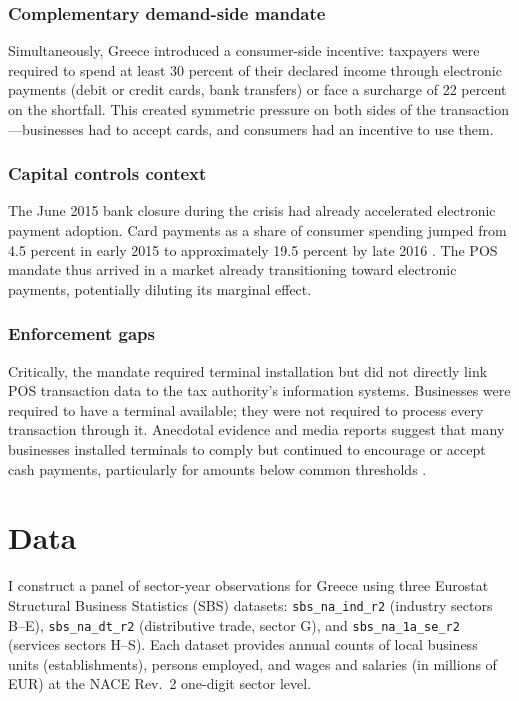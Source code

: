 \documentclass[12pt]{article}
\begin{document}
\subsubsection*{Complementary demand-side mandate} Simultaneously, Greece introduced a consumer-side incentive: taxpayers were required to spend at least 30 percent of their declared income through electronic payments (debit or credit cards, bank transfers) or face a surcharge of 22 percent on the shortfall. This created symmetric pressure on both sides of the transaction---businesses had to accept cards, and consumers had an incentive to use them.

\subsubsection*{Capital controls context} The June 2015 bank closure during the crisis had already accelerated electronic payment adoption. Card payments as a share of consumer spending jumped from 4.5 percent in early 2015 to approximately 19.5 percent by late 2016 \citep{hondroyiannis2020fiscal}. The POS mandate thus arrived in a market already transitioning toward electronic payments, potentially diluting its marginal effect.

\subsubsection*{Enforcement gaps} Critically, the mandate required terminal installation but did not directly link POS transaction data to the tax authority's information systems. Businesses were required to have a terminal available; they were not required to process every transaction through it. Anecdotal evidence and media reports suggest that many businesses installed terminals to comply but continued to encourage or accept cash payments, particularly for amounts below common thresholds \citep{kathimerini2018pos}.


\section{Data}

I construct a panel of sector-year observations for Greece using three Eurostat Structural Business Statistics (SBS) datasets: \texttt{sbs\_na\_ind\_r2} (industry sectors B--E), \texttt{sbs\_na\_dt\_r2} (distributive trade, sector G), and \texttt{sbs\_na\_1a\_se\_r2} (services sectors H--S). Each dataset provides annual counts of local business units (establishments), persons employed, and wages and salaries (in millions of EUR) at the NACE Rev.~2 one-digit sector level.
\end{document}
